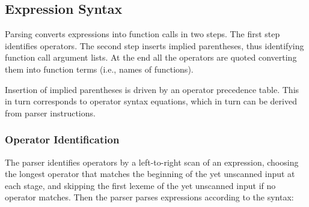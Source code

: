 \documentclass[12pt]{article}
\begin{document}
\subsection{Expression Syntax}
\label{EXPRESSION-SYNTAX}

Parsing converts expressions into function calls in two steps.
The first step identifies operators.  The second step inserts
implied parentheses, thus identifying function call argument lists.
At the end all the operators are quoted converting them into
function terms (i.e., names of functions).

Insertion of implied parentheses is driven by an operator
precedence table.  This in turn corresponds to operator
syntax equations, which in turn can be derived from parser
instructions.

\subsubsection{Operator Identification}
\label{OPERATOR-IDENTIFICATION}

The parser identifies operators by a left-to-right scan of
an expression, choosing the longest operator that matches the
beginning of the yet unscanned input at each stage, and skipping
the first lexeme of the yet unscanned input if no operator matches.
Then the parser parses expressions according to the syntax:
\end{document}

